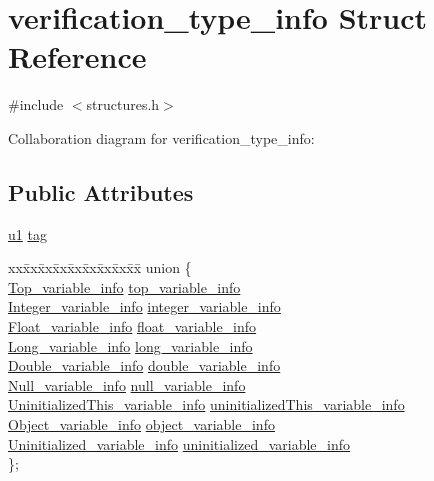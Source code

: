 \hypertarget{structverification__type__info}{}\section{verification\+\_\+type\+\_\+info Struct Reference}
\label{structverification__type__info}


{\ttfamily \#include $<$structures.\+h$>$}



Collaboration diagram for verification\+\_\+type\+\_\+info\+:
\subsection*{Public Attributes}
\begin{DoxyCompactItemize}
\item 
\hyperlink{structures_8h_a64f8055b64cf2a4c299c841130c5c938}{u1} \hyperlink{structverification__type__info_aeb9c72b398b4d3ce0863a916f973b05c}{tag}
\item 
\begin{tabbing}
xx\=xx\=xx\=xx\=xx\=xx\=xx\=xx\=xx\=\kill
union \{\\
\>\hyperlink{structTop__variable__info}{Top\_variable\_info} \hyperlink{structverification__type__info_aa9c08dabdcc9eb9cd6887ffc1b7acdb0}{top\_variable\_info}\\
\>\hyperlink{structInteger__variable__info}{Integer\_variable\_info} \hyperlink{structverification__type__info_aa0eb61689487e7851038e8e0ba37a6b6}{integer\_variable\_info}\\
\>\hyperlink{structFloat__variable__info}{Float\_variable\_info} \hyperlink{structverification__type__info_a73db385fdde1fdd46b6ff6386bf28320}{float\_variable\_info}\\
\>\hyperlink{structLong__variable__info}{Long\_variable\_info} \hyperlink{structverification__type__info_a2d890836853a27c0f4bff1b135b3d844}{long\_variable\_info}\\
\>\hyperlink{structDouble__variable__info}{Double\_variable\_info} \hyperlink{structverification__type__info_ac01c6db2b8dd5bfe47a98a2ec2528448}{double\_variable\_info}\\
\>\hyperlink{structNull__variable__info}{Null\_variable\_info} \hyperlink{structverification__type__info_a1f4205281e4346364160c3929783befc}{null\_variable\_info}\\
\>\hyperlink{structUninitializedThis__variable__info}{UninitializedThis\_variable\_info} \hyperlink{structverification__type__info_a40830fd30b55a46a26d9c209bba7b3a8}{uninitializedThis\_variable\_info}\\
\>\hyperlink{structObject__variable__info}{Object\_variable\_info} \hyperlink{structverification__type__info_a7efcdeee31cb5c174267bf13a7386f31}{object\_variable\_info}\\
\>\hyperlink{structUninitialized__variable__info}{Uninitialized\_variable\_info} \hyperlink{structverification__type__info_a036f3ae811e853852803f816c0d69933}{uninitialized\_variable\_info}\\
\}; \\


\end{tabbing}
\end{DoxyCompactItemize}

